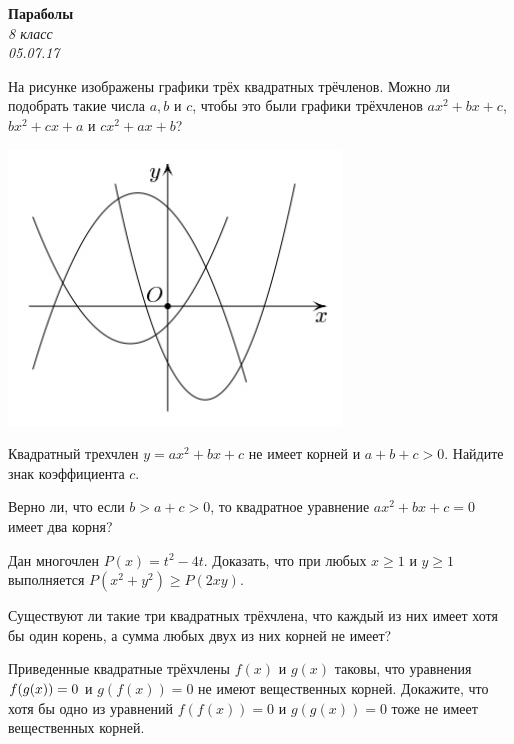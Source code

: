 \begin{center}
\textbf{\Large Параболы}\\
\textit{8 класс}\\
\textit{05.07.17}
\end{center}

\begin{problems}
\item На рисунке изображены графики трёх квадратных трёчленов. Можно ли подобрать такие числа $a, b$ и $c$, чтобы это были графики трёхчленов $ax^2 + bx + c$, $bx^2 + cx + a$  и $cx^2 + ax + b$?

\begin{center}
\includegraphics[scale=0.8]{simple/parabola.jpg}
\end{center}

\item Квадратный трехчлен $y = ax^2 + bx + c$  не имеет корней и $a + b + c > 0$.  Найдите знак коэффициента $c$.

\item Верно ли, что если $b > a + c > 0$, то квадратное уравнение $ax^2 + bx + c = 0$ имеет два корня?

\item Дан многочлен $P(x) = t^2 - 4t$. Доказать, что при любых $x \ge 1$ и $y \ge 1$ выполняется $P(x^2+y^2) \ge P(2xy)$. 

\item Существуют ли такие три квадратных трёхчлена, что каждый из них имеет хотя бы один корень, а сумма любых двух из них корней не имеет?

\item 

\item Приведенные квадратные трёхчлены $f(x)$ и $g(x)$ таковы, что уравнения  $f(g(x))\hm= 0$  и  $g(f(x)) = 0$  не имеют вещественных корней. Докажите, что хотя бы одно из уравнений  $f(f(x)) = 0$  и  $g(g(x)) = 0$  тоже не имеет вещественных корней.
\end{problems}